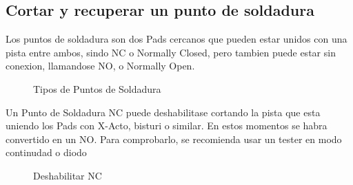 \subsection{Cortar y recuperar un punto de soldadura}
Los puntos de soldadura son dos Pads cercanos que pueden estar unidos con una pista entre
ambos, sindo NC o Normally Closed, pero tambien puede estar sin conexion, llamandose NO, o
Normally Open. 

\begin{figure}[H]
    \centering
    
    \caption{Tipos de Puntos de Soldadura}
    \label{fig:JpTipos}
\end{figure}

Un Punto de Soldadura NC puede deshabilitase cortando la pista que esta uniendo los Pads
con X-Acto, bisturi o similar. En estos momentos se
habra convertido en un NO. Para comprobarlo, se recomienda usar un tester en modo
continudad o diodo

\begin{figure}[H]
    \centering
    
    \caption{Deshabilitar NC}
    \label{fig:JpNc2No}
\end{figure}
